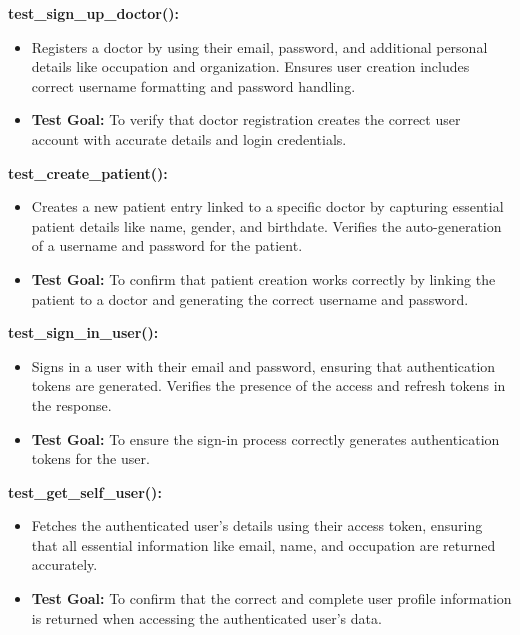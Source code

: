 \documentclass[12pt, titlepage]{article}
\begin{document}
\begin{enumerate}
\textbf{test\_sign\_up\_doctor():}  
\begin{itemize}
    \item Registers a doctor by using their email, password, and additional personal details like occupation and organization. Ensures user creation includes correct username formatting and password handling.
    \item \textbf{Test Goal:} To verify that doctor registration creates the correct user account with accurate details and login credentials. 
    \newline
\end{itemize}

\textbf{test\_create\_patient():}  
\begin{itemize}
    \item Creates a new patient entry linked to a specific doctor by capturing essential patient details like name, gender, and birthdate. Verifies the auto-generation of a username and password for the patient.
    \item \textbf{Test Goal:} To confirm that patient creation works correctly by linking the patient to a doctor and generating the correct username and password. 
    \newline
\end{itemize}

\textbf{test\_sign\_in\_user():}  
\begin{itemize}
    \item Signs in a user with their email and password, ensuring that authentication tokens are generated. Verifies the presence of the access and refresh tokens in the response.
    \item \textbf{Test Goal:} To ensure the sign-in process correctly generates authentication tokens for the user. 
    \newline
\end{itemize}

\textbf{test\_get\_self\_user():}  
\begin{itemize}
    \item Fetches the authenticated user's details using their access token, ensuring that all essential information like email, name, and occupation are returned accurately.
    \item \textbf{Test Goal:} To confirm that the correct and complete user profile information is returned when accessing the authenticated user's data. 
    \newline
\end{itemize}


\end{enumerate}
\end{document}
